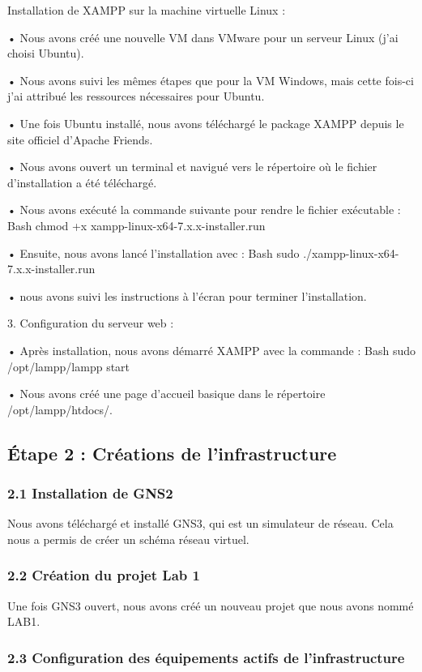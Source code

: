\documentclass[12pt,a4paper]{report}
\begin{document}
		Installation de XAMPP sur la machine virtuelle Linux :
	
	• Nous avons créé une nouvelle VM dans VMware pour un serveur Linux (j'ai choisi Ubuntu).
	
	• Nous avons suivi les mêmes étapes que pour la VM Windows, mais cette fois-ci j'ai attribué les ressources nécessaires pour Ubuntu.
	
	
	• Une fois Ubuntu installé, nous avons téléchargé le package XAMPP depuis le site officiel d'Apache Friends.
	
	
	• Nous avons ouvert un terminal et navigué vers le répertoire où le fichier d'installation a été téléchargé.
	
	• Nous avons exécuté la commande suivante pour rendre le fichier exécutable :
	Bash
	chmod +x xampp-linux-x64-7.x.x-installer.run
	
	
	• Ensuite, nous avons lancé l'installation avec :
	Bash	
	sudo ./xampp-linux-x64-7.x.x-installer.run
	
	
	• nous avons suivi les instructions à l'écran pour terminer l'installation.
	
	3. Configuration du serveur web :
	
	• Après installation, nous avons démarré XAMPP avec la commande :
	Bash
	sudo /opt/lampp/lampp start
	
	• Nous avons créé une page d'accueil basique dans le répertoire /opt/lampp/htdocs/.
	
\subsection{Étape 2 : Créations de l'infrastructure}	
	
\subsubsection{2.1 Installation de GNS2}	
	
	Nous avons téléchargé et installé GNS3, qui est un simulateur de réseau. Cela nous a permis de créer un schéma réseau virtuel.
	
\subsubsection{2.2 Création du projet Lab 1}		
	
	Une fois GNS3 ouvert, nous avons créé un nouveau projet que nous avons nommé LAB1.
	
\subsubsection{2.3 Configuration des équipements actifs de l'infrastructure}	
	
\end{document}
